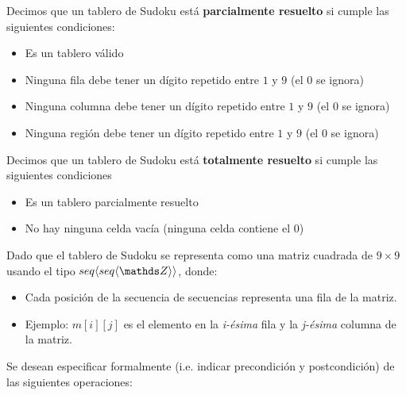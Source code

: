 \documentclass[spanish,a4paper]{article}
\begin{document}
Decimos que un tablero de Sudoku est\'a \textbf{parcialmente resuelto} si cumple las siguientes condiciones:
\begin{itemize}
\item Es un tablero v\'alido
\item Ninguna fila debe tener un d\'igito repetido entre $1$ y $9$ (el $0$ se ignora)
\item Ninguna columna debe tener un d\'igito repetido entre $1$ y $9$ (el $0$ se ignora)
\item Ninguna regi\'on debe tener un d\'igito repetido entre $1$ y $9$ (el $0$ se ignora)
\end{itemize}

Decimos que un tablero de Sudoku est\'a \textbf{totalmente resuelto} si cumple las siguientes condiciones
\begin{itemize}
\item Es un tablero parcialmente resuelto
\item No hay ninguna celda vac\'ia (ninguna celda contiene el $0$)
\end{itemize}


Dado que el tablero de Sudoku se representa como una matriz cuadrada de $9 \times 9$ usando el tipo $\TLista{\TLista{\ent}}$, donde:
\begin{itemize}
\item Cada posici\'on de la secuencia de secuencias representa una fila de la matriz.
\item Ejemplo:  $m[i][j]$ es el elemento en la \emph{i-\'esima} fila y la \emph{j-\'esima} columna de la matriz. 
\end{itemize}
 
Se desean especificar formalmente (i.e. indicar precondici\'on y postcondici\'on) de las siguientes operaciones:
\end{document}
